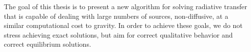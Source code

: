 
The goal of this thesis is to present a new algorithm for solving radiative transfer that is capable of dealing with large numbers of sources, non-diffusive, at a similar computational cost to gravity. In order to achieve these goals, we do not stress achieving exact solutions, but aim for correct qualitative behavior and correct equilibrium solutions.

%
%

